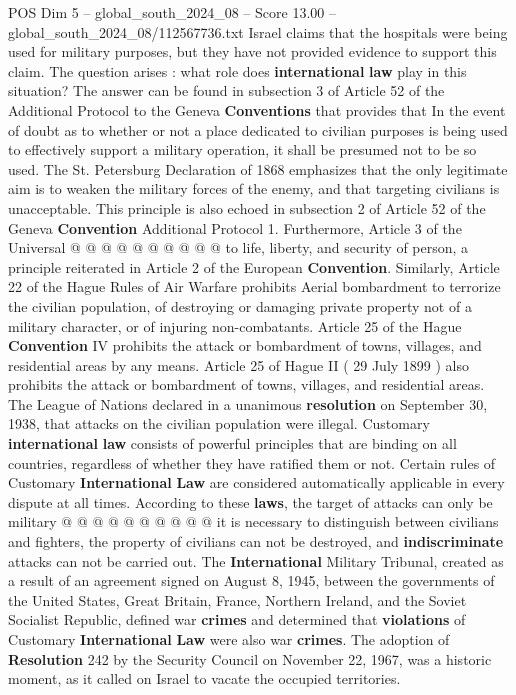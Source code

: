 \begin{textsample}{POS Dim 5 – global\_south\_2024\_08 – Score 13.00 – global\_south\_2024\_08/112567736.txt}
Israel claims that the hospitals were being used for military purposes, but they have not provided evidence to support this claim.
The question arises : what role does \textbf{international} \textbf{law} play in this situation?
The answer can be found in subsection 3 of Article 52 of the Additional Protocol to the Geneva \textbf{Conventions} that provides that In the event of doubt as to whether or not a place dedicated to civilian purposes is being used to effectively support a military operation, it shall be presumed not to be so used.
The St.
Petersburg Declaration of 1868 emphasizes that the only legitimate aim is to weaken the military forces of the enemy, and that targeting civilians is unacceptable.
This principle is also echoed in subsection 2 of Article 52 of the Geneva \textbf{Convention} Additional Protocol 1.
Furthermore, Article 3 of the Universal @ @ @ @ @ @ @ @ @ @ to life, liberty, and security of person, a principle reiterated in Article 2 of the European \textbf{Convention}.
Similarly, Article 22 of the Hague Rules of Air Warfare prohibits Aerial bombardment to terrorize the civilian population, of destroying or damaging private property not of a military character, or of injuring non-combatants.
Article 25 of the Hague \textbf{Convention} IV prohibits the attack or bombardment of towns, villages, and residential areas by any means.
Article 25 of Hague II ( 29 July 1899 ) also prohibits the attack or bombardment of towns, villages, and residential areas.
The League of Nations declared in a unanimous \textbf{resolution} on September 30, 1938, that attacks on the civilian population were illegal.
Customary \textbf{international} \textbf{law} consists of powerful principles that are binding on all countries, regardless of whether they have ratified them or not.
Certain rules of Customary \textbf{International} \textbf{Law} are considered automatically applicable in every dispute at all times.
According to these \textbf{laws}, the target of attacks can only be military @ @ @ @ @ @ @ @ @ @ it is necessary to distinguish between civilians and fighters, the property of civilians can not be destroyed, and \textbf{indiscriminate} attacks can not be carried out.
The \textbf{International} Military Tribunal, created as a result of an agreement signed on August 8, 1945, between the governments of the United States, Great Britain, France, Northern Ireland, and the Soviet Socialist Republic, defined war \textbf{crimes} and determined that \textbf{violations} of Customary \textbf{International} \textbf{Law} were also war \textbf{crimes}.
The adoption of \textbf{Resolution} 242 by the Security Council on November 22, 1967, was a historic moment, as it called on Israel to vacate the occupied territories.

\end{textsample}
